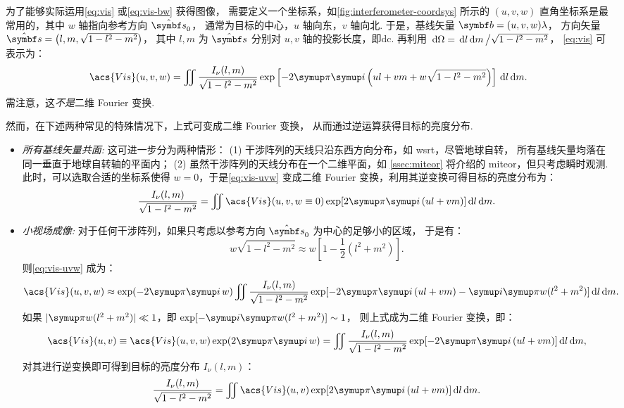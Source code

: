 为了能够实际运用\autoref{eq:vis} 或\autoref{eq:vis-bw} 获得图像，
需要定义一个坐标系，如\autoref{fig:interferometer-coordsys}
所示的 $(u,v,w)$ 直角坐标系是最常用的，其中 $w$ 轴指向参考方向 $\hat{\B{s}}_0$，
通常为目标的中心，$u$ 轴向东，$v$ 轴向北.
于是，基线矢量 $\B{b} = (u,v,w) \lambda$，
方向矢量 $\hat{\B{s}} = \left( l, m, \sqrt{1-l^2-m^2} \right)$，
其中 $l, m$ 为 $\hat{\B{s}}$ 分别对 $u, v$ 轴的投影长度，即\ac{dc}.
再利用 $\,\mathrm{d}\Omega = \,\mathrm{d}l\,\mathrm{d}m \,\big/ \sqrt{1-l^2-m^2}$，
\autoref{eq:vis} 可表示为：
\begin{equation}
  \label{eq:vis-uvw}
  \acs{Vis}(u,v,w) = \iint \frac{I_{\nu}(l,m)}{\sqrt{1-l^2-m^2}}
    \exp \left[ -2\Cpi\Ci \left( ul+vm+w\sqrt{1-l^2-m^2} \right) \right]
    \D{l}\D{m}.
\end{equation}
需注意，这\emph{不是}二维 Fourier 变换.

然而，在下述两种常见的特殊情况下，上式可变成二维 Fourier 变换，
从而通过逆运算获得目标的亮度分布.
\begin{itemize}
\item
\emph{所有基线矢量共面:}
这可进一步分为两种情形：
(1) 干涉阵列的天线只沿东西方向分布，如 \ac{wsrt}，尽管地球自转，
所有基线矢量均落在同一垂直于地球自转轴的平面内；
(2) 虽然干涉阵列的天线分布在一个二维平面，如 \autoref{ssec:miteor}
将介绍的 \ac*{miteor}，但只考虑瞬时观测.
此时，可以选取合适的坐标系使得 $w = 0$，于是\autoref{eq:vis-uvw}
变成二维 Fourier 变换，利用其逆变换可得目标的亮度分布为：
\begin{equation}
  \label{eq:vis-inv1}
  \frac{I_{\nu}(l,m)}{\sqrt{1-l^2-m^2}} = \iint \acs{Vis}(u,v, w \equiv 0)
    \exp [2\Cpi\Ci\, (ul+vm)] \D{l}\D{m}.
\end{equation}

\item
\emph{小视场成像:}
对于任何干涉阵列，如果只考虑以参考方向 $\hat{\B{s}}_0$ 为中心的足够小的区域，
于是有：
\begin{equation}
  w\sqrt{1-l^2-m^2} \approx w \left[ 1 - \frac{1}{2} (l^2+m^2) \right].
\end{equation}
则\autoref{eq:vis-uvw} 成为：
\begin{equation}
  \acs{Vis}(u,v,w) \approx \exp (-2\Cpi\Ci\,w) \iint
    \frac{I_{\nu}(l,m)}{\sqrt{1-l^2-m^2}}
    \exp [-2\Cpi\Ci\, (ul+vm) -\Ci\Cpi w(l^2+m^2)] \D{l}\D{m}.
\end{equation}
如果 $|\Cpi w(l^2+m^2)| \ll 1$，即 $\exp [-\Ci\Cpi w(l^2+m^2)] \sim 1$，
则上式成为二维 Fourier 变换，即：
\begin{equation}
  \acs{Vis}(u,v) \equiv \acs{Vis}(u,v,w) \exp (2\Cpi\Ci\,w)
    = \iint \frac{I_{\nu}(l,m)}{\sqrt{1-l^2-m^2}}
    \exp [-2\Cpi\Ci\, (ul+vm)] \D{l}\D{m},
\end{equation}
对其进行逆变换即可得到目标的亮度分布 $I_{\nu}(l,m)$：
\begin{equation}
  \label{eq:vis-inv2}
  \frac{I_{\nu}(l,m)}{\sqrt{1-l^2-m^2}} = \iint \acs{Vis}(u,v)
    \exp [2\Cpi\Ci\, (ul+vm)] \D{l}\D{m}.
\end{equation}

\end{itemize}

